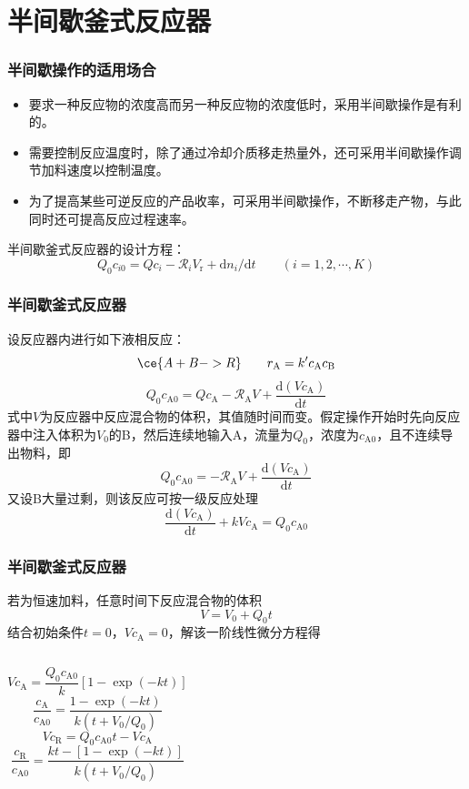 \section{半间歇釜式反应器}


\begin{frame}
    \frametitle{半间歇操作的适用场合}

    \large \begin{itemize}
        \item 要求一种反应物的浓度高而另一种反应物的浓度低时，采用半间歇操作是有利的。
        \item 需要控制反应温度时，除了通过冷却介质移走热量外，还可采用半间歇操作调节加料速度以控制温度。
        \item 为了提高某些可逆反应的产品收率，可采用半间歇操作，不断移走产物，与此同时还可提高反应过程速率。
    \end{itemize}
    半间歇釜式反应器的设计方程：
    \[
        Q_0c_{i0}=Qc_{i}-\mathcal{R}_iV_\mathrm{r}+\mathrm{d}n_i/\mathrm{d}t \qquad (i=1,2,\cdots,K)
    \]
\end{frame}


\begin{frame}
    \frametitle{半间歇釜式反应器}

    设反应器内进行如下液相反应：
    \[
    \ce{A + B -> R} \qquad r_\mathrm{A}=k'c_\mathrm{A}c_\mathrm{B}
    \]
    \[
        Q_{0} c_{\mathrm{A} 0}=Q c_{\mathrm{A}}-\mathscr{R}_{\mathrm{A}} V+\frac{\mathrm{d}(V c_{\mathrm{A}})}{\mathrm{d} t} 
    \]
    式中$V$为反应器中反应混合物的体积，其值随时间而变。假定操作开始时先向反应器中注入体积为$V_0$的B，然后连续地输入A，流量为$Q_0$，浓度为$c_\mathrm{A0}$，且不连续导出物料，即
    \[
        Q_{0} c_{\mathrm{A} 0}=-\mathscr{R}_{\mathrm{A}} V+\frac{\mathrm{d}(V c_{\mathrm{A}})}{\mathrm{d} t} 
    \]
    又设B大量过剩，则该反应可按一级反应处理
    \[
        \frac{\mathrm{d}(V c_{\mathrm{A}})}{\mathrm{d} t}+k V c_{\mathrm{A}}=Q_{0} c_{\mathrm{A} 0} 
    \]
\end{frame}


\begin{frame}
    \frametitle{半间歇釜式反应器}

    \large 若为恒速加料，任意时间下反应混合物的体积
    \[
        V=V_{0}+Q_{0} t 
    \]
    结合初始条件$t=0$，$V c_{\mathrm{A}}=0$，解该一阶线性微分方程得
    \begin{columns}[c]
        \column{7cm}
        \[
        V c_{\mathrm{A}}=\frac{Q_{0} c_{\mathrm{A} 0}}{k}[1-\exp (-k t)] 
    \]
    \[
        \frac{c_{\mathrm{A}}}{c_{\mathrm{A} 0}}=\frac{1-\exp (-k t)}{k(t+V_{0} / Q_{0})}
    \]
        \column{6.5cm}
        \[
            V c_{\mathrm{R}}=Q_{0} c_{\mathrm{A} 0} t-V c_{\mathrm{A}} 
        \]
        \[
            \frac{c_{\mathrm{R}}}{c_{\mathrm{A} 0}}=\frac{k t-[1-\exp (-k t)]}{k(t+V_{0} / Q_{0})}
        \]
    \end{columns}
    
    

\end{frame}


